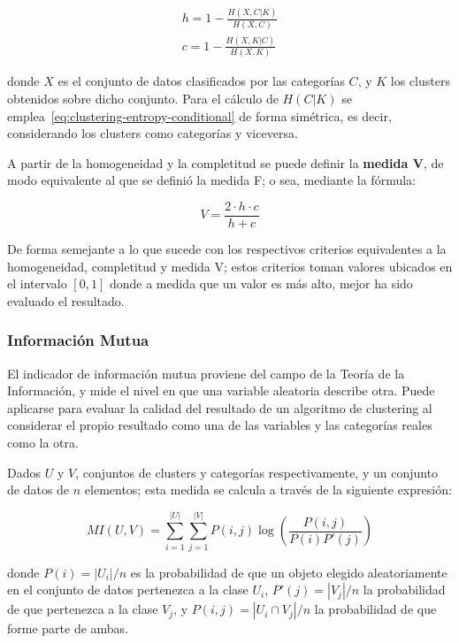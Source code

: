 \begin{gather}
    h = 1 - \frac{H(X, C|K)}{H(X, C)} \\
    c = 1 - \frac{H(X, K|C)}{H(X, K)}
\end{gather}

\noindent
donde $X$ es el conjunto de datos clasificados por las categorías $C$, y $K$ los clusters obtenidos sobre dicho conjunto.
Para el cálculo de $H(C|K)$ se emplea~\ref{eq:clustering-entropy-conditional} de forma simétrica, es decir, considerando los clusters como categorías y viceversa.

A partir de la homogeneidad y la completitud se puede definir la \textbf{medida V}, de modo equivalente al que se definió la medida F;
o sea, mediante la fórmula:

\begin{equation}
    \label{eq:V-measure}
    V = \frac{2 \cdot h \cdot c}{h + c}
\end{equation}

De forma semejante a lo que sucede con los respectivos criterios equivalentes a la homogeneidad, completitud y medida V;
estos criterios toman valores ubicados en el intervalo $[0,1]$ donde a medida que un valor es más alto, mejor ha sido evaluado el resultado.

\subsubsection{Información Mutua}

El indicador de información mutua proviene del campo de la Teoría de la Información, y mide el nivel en que una variable aleatoria describe otra.
Puede aplicarse para evaluar la calidad del resultado de un algoritmo de clustering al considerar el propio resultado como una de las variables y las categorías reales como la otra.

Dados $U$ y $V$, conjuntos de clusters y categorías respectivamente, y un conjunto de datos de $n$ elementos;
esta medida se calcula a través de la siguiente expresión:

\begin{equation}
    \label{eq:mutual-information}
    MI(U,V) = \sum_{i=1}^{|U|}\sum_{j=1}^{|V|}{P(i,j)\log{\left( \frac{P(i,j)}{P(i)P'(j)} \right)}}
\end{equation}

\noindent
donde $P(i) = |U_i|/n$ es la probabilidad de que un objeto elegido aleatoriamente en el conjunto de datos pertenezca a la clase $U_i$, $P'(j) = |V_j|/n$ la probabilidad de que pertenezca a la clase $V_j$, y $P(i,j) = |U_i \cap V_j|/n$ la probabilidad de que forme parte de ambas.

